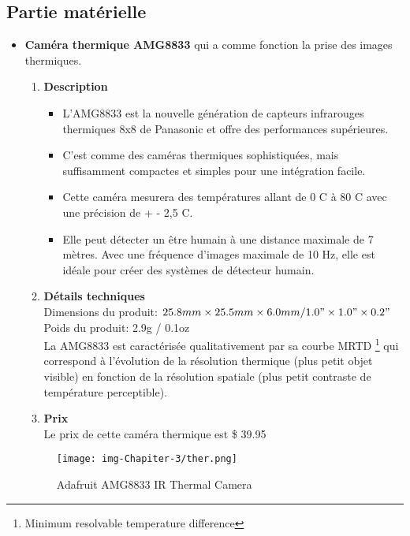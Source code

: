 \documentclass[12pt]{article}
\begin{document}
\subsection{Partie matérielle}
\begin{itemize}
	\item \textbf{Caméra thermique AMG8833} \cite{45} qui a comme fonction la prise des images thermiques.
	\begin{enumerate}
	\item \textbf{Description}\\
	\begin{itemize}
	\item L'AMG8833 est la nouvelle génération de capteurs infrarouges thermiques 8x8 de Panasonic et offre des performances supérieures.
	\item C'est comme des caméras thermiques sophistiquées, mais suffisamment compactes et simples pour une intégration facile.
	\item Cette caméra mesurera des températures allant de 0 C\textdegree{} à 80 C\textdegree{} avec une précision de + - 2,5 C\textdegree{}. 
	\item Elle peut détecter un être humain à une distance maximale de 7 mètres. Avec une fréquence d'images maximale de 10 Hz, elle est idéale pour créer des systèmes de détecteur humain.
	\end{itemize}
	\item \textbf{Détails techniques}\\
	Dimensions du produit: $25.8mm \times 25.5mm \times 6.0mm / 1.0 " \times 1.0" \times 0.2 "$\\
	Poids du produit: 2.9g / 0.1oz\\
	
	La AMG8833 est caractérisée qualitativement par sa courbe MRTD \footnote{Minimum resolvable temperature difference} qui correspond à l’évolution de la résolution thermique (plus petit objet visible) en fonction de la résolution spatiale (plus petit contraste de température perceptible).
	\item \textbf{Prix}\\
	Le prix de cette caméra thermique est  \$ 39.95  
\end{enumerate}	 

\begin{figure}[h]
	\centering
	\texttt{[image: img-Chapiter-3/ther.png]}
	\caption{Adafruit AMG8833 IR Thermal Camera}
\end{figure}


\end{itemize}
\end{document}
